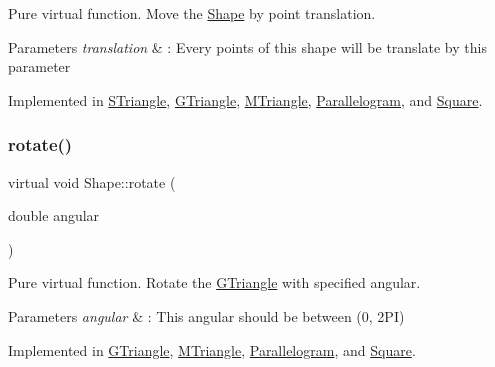 Pure virtual function. Move the \hyperlink{classShape}{Shape} by point translation. 


\begin{DoxyParams}{Parameters}
{\em translation} & \+: Every points of this shape will be translate by this parameter \\
\hline
\end{DoxyParams}


Implemented in \hyperlink{classSTriangle_a9cd1c7e14501b314405745dcc296ee63}{S\+Triangle}, \hyperlink{classGTriangle_a89910a7f176743473d3bfd15de01377d}{G\+Triangle}, \hyperlink{classMTriangle_a1b029feefcf7e3febcdae179557b4c2e}{M\+Triangle}, \hyperlink{classParallelogram_a982287c8d16ec47951db62b07eb77feb}{Parallelogram}, and \hyperlink{classSquare_a6be02369ff07934179f6bfd6360fb9d3}{Square}.

\mbox{\label{classShape_a2dea8616fd40f2d69fd208715921982a}} 
\subsubsection{\texorpdfstring{rotate()}{rotate()}}
{\footnotesize\ttfamily virtual void Shape\+::rotate (\begin{DoxyParamCaption}\item[{double}]{angular }\end{DoxyParamCaption})\hspace{0.3cm}{\ttfamily [pure virtual]}}



Pure virtual function. Rotate the \hyperlink{classGTriangle}{G\+Triangle} with specified angular. 


\begin{DoxyParams}{Parameters}
{\em angular} & \+: This angular should be between (0, 2\+PI) \\
\hline
\end{DoxyParams}


Implemented in \hyperlink{classGTriangle_ae3ed75bbad4ba7fed68bc06c5834cfbe}{G\+Triangle}, \hyperlink{classMTriangle_a4be29553eeddf99c367b1ec220bc102b}{M\+Triangle}, \hyperlink{classParallelogram_ac498f6a15dea236ecc49bece023d17b0}{Parallelogram}, and \hyperlink{classSquare_a5714e182c30f996b78e74e1badd054a2}{Square}.

\mbox{\label{classShape_a98fa87c6dc4c7045fd6897a8f3bc186c}} 
